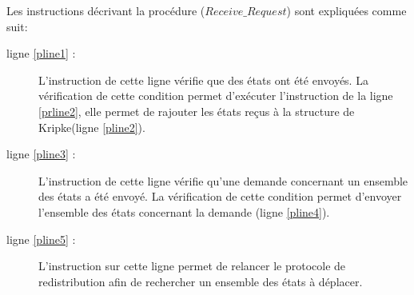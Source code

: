 \begin{algorithm}
 \SetAlgoLined\DontPrintSemicolon
\end{algorithm}

Les instructions décrivant la procédure ($Receive\_ Request$) sont expliquées comme suit:
\begin{description}
\item[ligne \ref{pline1} :] L'instruction de cette ligne vérifie que des états ont été  envoyés. La vérification de cette condition permet d'exécuter l'instruction de la ligne \ref{prline2}, elle permet de rajouter les états reçus à la structure de Kripke(ligne \ref{pline2}). 
\item[ligne \ref{pline3} :] L'instruction de cette ligne vérifie qu'une demande concernant un ensemble des états a été envoyé. La vérification de cette condition permet d'envoyer l'ensemble des états concernant la demande (ligne \ref{pline4}). 
\item[ligne \ref{pline5} :] L'instruction sur cette ligne permet de relancer le protocole de redistribution afin de rechercher un ensemble des états à déplacer.   
\end{description}